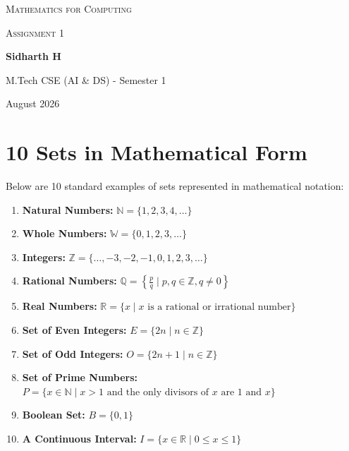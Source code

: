 \documentclass[12pt, a4paper]{article}
\begin{document}
\begin{titlepage}
    \centering
    \vspace*{2cm}
    
    {\scshape\LARGE Mathematics for Computing\par}
    \vspace{0.5cm}
    {\scshape\Large Assignment 1\par}
    \vspace{0.5cm}
    
    \vspace{2cm}
    
    {\Large \textbf{Sidharth H}}\par
    \vspace{0.5cm}
    {\large M.Tech CSE (AI \& DS) - Semester 1}\par
    
    \vfill
    
    {\large August 2026\par}
\end{titlepage}

\newpage
\tableofcontents
\newpage


\section{10 Sets in Mathematical Form}
Below are 10 standard examples of sets represented in mathematical notation:

\begin{enumerate}
    \item \textbf{Natural Numbers:} $\mathbb{N} = \{1, 2, 3, 4, \dots\}$
    \item \textbf{Whole Numbers:} $\mathbb{W} = \{0, 1, 2, 3, \dots\}$
    \item \textbf{Integers:} $\mathbb{Z} = \{\dots, -3, -2, -1, 0, 1, 2, 3, \dots\}$
    \item \textbf{Rational Numbers:} $\mathbb{Q} = \left\{ \frac{p}{q} \mid p, q \in \mathbb{Z}, q \neq 0 \right\}$
    \item \textbf{Real Numbers:} $\mathbb{R} = \{x \mid x \text{ is a rational or irrational number}\}$
    \item \textbf{Set of Even Integers:} $E = \{2n \mid n \in \mathbb{Z}\}$
    \item \textbf{Set of Odd Integers:} $O = \{2n + 1 \mid n \in \mathbb{Z}\}$
    \item \textbf{Set of Prime Numbers:} $P = \{x \in \mathbb{N} \mid x > 1 \text{ and the only divisors of } x \text{ are } 1 \text{ and } x\}$
    \item \textbf{Boolean Set:} $B = \{0, 1\}$
    \item \textbf{A Continuous Interval:} $I = \{x \in \mathbb{R} \mid 0 \le x \le 1\}$
\end{enumerate}
\end{document}
